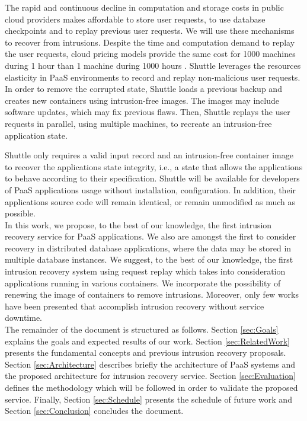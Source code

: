 The rapid and continuous decline in computation and storage costs in public cloud providers makes affordable to store user requests, to use database checkpoints and to replay previous user requests. We will use these mechanisms to recover from intrusions. Despite the time and computation demand to replay the user requests, cloud pricing models provide the same cost for 1000 machines during 1 hour than 1 machine during 1000 hours \cite{Armbrust}. Shuttle leverages the resources elasticity in PaaS environments to record and replay non-malicious user requests. In order to remove the corrupted state, Shuttle loads a previous backup and creates new containers using intrusion-free images. The images may include software updates, which may fix previous flaws. Then, Shuttle replays the user requests in parallel, using multiple machines, to recreate an intrusion-free application state. 

Shuttle only requires a valid input record and an intrusion-free container image to recover the applications state integrity, i.e., a state that allows the applications to behave according to their specification. Shuttle will be available for developers of PaaS applications usage without installation, configuration. In addition, their applications source code will remain identical, or remain unmodified as much as possible.\\

In this work, we propose, to the best of our knowledge, the first intrusion recovery service for PaaS applications. We also are amongst the first to consider recovery in distributed database applications, where the data may be stored in multiple database instances. We suggest, to the best of our knowledge, the first intrusion recovery system using request replay which takes into consideration applications running in various containers. We incorporate the possibility of renewing the image of containers to remove intrusions. Moreover, only few works have been presented that accomplish intrusion recovery without service downtime.\\

The remainder of the document is structured as follows. Section \ref{sec:Goals} explains the goals and expected results of our work. Section \ref{sec:RelatedWork} presents the fundamental concepts and previous intrusion recovery proposals. Section \ref{sec:Architecture} describes briefly the architecture of PaaS systems and the proposed architecture for intrusion recovery service. Section \ref{sec:Evaluation} defines the methodology which will be followed in order to validate the proposed service. Finally, Section \ref{sec:Schedule} presents the schedule of future work and Section \ref{sec:Conclusion} concludes the document.


